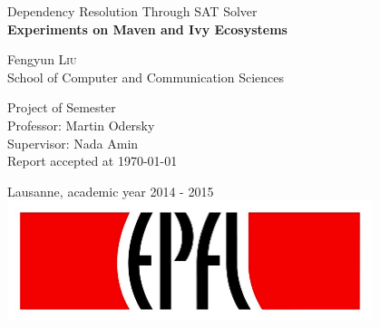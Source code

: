\begin{titlepage}

  \begin{center}

    \vspace*{3\baselineskip}
    {\Large Dependency Resolution Through SAT Solver \\[0.4cm] }
    {\bfseries Experiments on Maven and Ivy Ecosystems\\[1.5cm] }

    \noindent
    Fengyun \textsc{Liu} \\[0.3cm]

    \noindent
    {School of Computer and Communication Sciences \\[2cm]}

    \begin{framed}
    Project of Semester \\
    Professor: Martin Odersky \\
    Supervisor: Nada Amin \\
    Report accepted at \today
    \end{framed}

    \noindent
    Lausanne, academic year 2014 - 2015 \\[1cm]

    \includegraphics[width=0.8\textwidth]{img/epfl}~\\[1cm]



  \end{center}

\end{titlepage}
